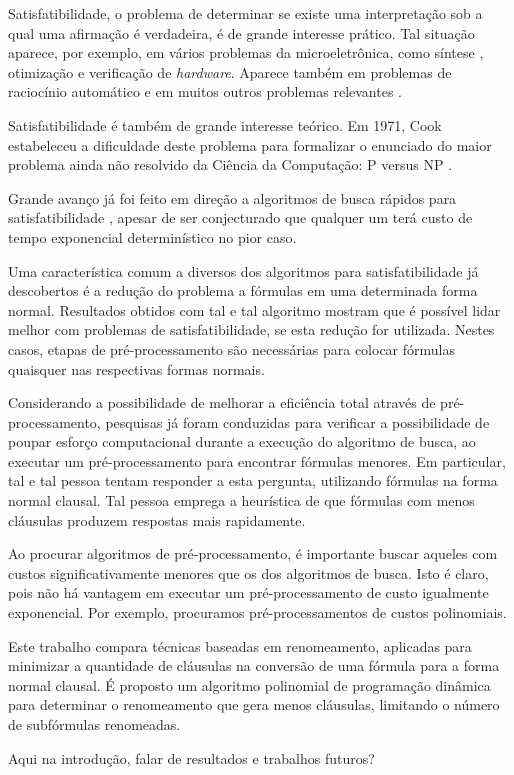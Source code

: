 \indent

Satisfatibilidade, o problema de determinar se existe uma interpretação sob a qual uma afirmação é verdadeira, é de grande interesse prático. Tal situação aparece, por exemplo, em vários problemas da microeletrônica, como síntese \cite{bloem2014sat}, otimização \cite{gupta2006sat} e verificação \cite{nieuwenhuis2006sat} de \textit{hardware}. Aparece também em problemas de raciocínio automático \cite{harrison2009handbook} e em muitos outros problemas relevantes \cite{horvitz1992automated}.

Satisfatibilidade é também de grande interesse teórico. Em 1971, Cook estabeleceu a dificuldade deste problema para formalizar o enunciado do maior problema ainda não resolvido da Ciência da Computação: P versus NP \cite{cook1971complexity}.

Grande avanço já foi feito em direção a algoritmos de busca rápidos para satisfatibilidade \cite{davis1960computing,davis1962machine,biere2009conflict}, apesar de ser conjecturado que qualquer um terá custo de tempo exponencial determinístico no pior caso.

Uma característica comum a diversos dos algoritmos para satisfatibilidade já descobertos é a redução do problema a fórmulas em uma determinada forma normal. Resultados obtidos com tal e tal algoritmo mostram que é possível lidar melhor com problemas de satisfatibilidade, se esta redução for utilizada. Nestes casos, etapas de pré-processamento são necessárias para colocar fórmulas quaisquer nas respectivas formas normais.

Considerando a possibilidade de melhorar a eficiência total através de pré-processa\-mento, pesquisas já foram conduzidas para verificar a possibilidade de poupar esforço computacional durante a execução do algoritmo de busca, ao executar um pré-processamento para encontrar fórmulas menores. Em particular, tal e tal pessoa tentam responder a esta pergunta, utilizando fórmulas na forma normal clausal. Tal pessoa emprega a heurística de que fórmulas com menos cláusulas produzem respostas mais rapidamente.

Ao procurar algoritmos de pré-processamento, é importante buscar aqueles com custos significativamente menores que os dos algoritmos de busca. Isto é claro, pois não há vantagem em executar um pré-processamento de custo igualmente exponencial. Por exemplo, procuramos pré-processamentos de custos polinomiais.

Este trabalho compara técnicas baseadas em renomeamento, aplicadas para minimizar a quantidade de cláusulas na conversão de uma fórmula para a forma normal clausal. É proposto um algoritmo polinomial de programação dinâmica para determinar o renomeamento que gera menos cláusulas, limitando o número de subfórmulas renomeadas.

Aqui na introdução, falar de resultados e trabalhos futuros?